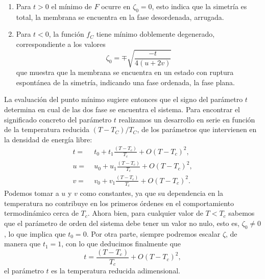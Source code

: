 \begin{enumerate}
\item Para $t>0$ el mínimo de $F$ ocurre en $\zeta_0=0$, esto indica que la
  simetría es total, la membrana se encuentra en la fase desordenada,
  arrugada.
\item Para $t<0$, la función $f_C$ tiene mínimo doblemente
  degenerado, correspondiente a los valores
  \begin{equation}\label{zeta_0}
    \zeta_0=\mp \sqrt{\frac{-t}{4(u+2v)}}
  \end{equation}
  que muestra que la membrana se encuentra en un estado con ruptura espontánea
  de la simetría, indicando una fase ordenada, la fase plana. 
\end{enumerate}

La evaluación del punto mínimo sugiere entonces que el
signo del parámetro $t$ determina en cual de las dos fase se encuentra el
sistema. Para encontrar el significado concreto del parámetro $t$
realizamos un desarrollo en serie en función de la temperatura reducida
$(T-T_C)/T_C$, de los parámetros que intervienen en la densidad de energía libre:
\begin{align*}
t=&\; t_0+t_1\frac{(T-T_c)}{T_c}+O(T-T_c)^2,\\
u=&\; u_0+u_1\frac{(T-T_c)}{T_c}+O(T-T_c)^2,\\
v=&\; v_0+v_1\frac{(T-T_c)}{T_c}+O(T-T_c)^2.
\end{align*}
Podemos tomar a $u$ y $v$ como constantes, ya que su dependencia en la 
temperatura no contribuye en los primeros órdenes en el comportamiento
termodinámico cerca de $T_c$. Ahora bien,
para cualquier valor de $T\!<\!T_c$ sabemos que el parámetro de orden del
sistema debe tener un valor no nulo, esto es, $\zeta_0\!\neq\! 0$, lo que
implica que $t_0=0$. Por otra parte, siempre podremos escalar $\zeta$, 
de manera que $t_1=1$, con lo que deducimos finalmente que
\begin{equation*}
t=\frac{(T-T_c)}{T_c}+O(T-T_c)^2,
\end{equation*}
el parámetro $t$ es la temperatura reducida adimensional.



